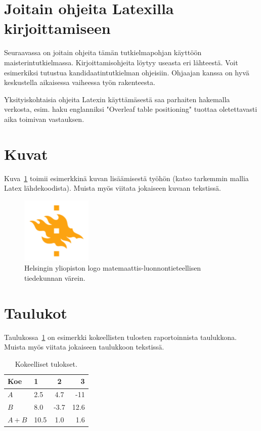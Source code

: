 \section{Joitain ohjeita Latexilla kirjoittamiseen}

Seuraavassa on joitain ohjeita tämän tutkielmapohjan käyttöön maisterintutkielmassa. Kirjoittamisohjeita löytyy useasta eri lähteestä. Voit esimerkiksi tutustua kandidaatintutkielman ohjeisiin. 
Ohjaajan kanssa on hyvä keskustella aikaisessa vaiheessa työn rakenteesta.

Yksityiskohtaisia ohjeita Latexin käyttämäsestä saa parhaiten hakemalla verkosta, esim. haku englanniksi "Overleaf table positioning" tuottaa oletettavasti aika toimivan vastauksen.

\section{Kuvat}
Kuva~\ref{fig:logo-fi} toimii esimerkkinä kuvan lisäämisestä työhön (katso tarkemmin mallia Latex lähdekoodista). Muista myös viitata jokaiseen kuvaan tekstissä. 

\begin{figure}[ht] %
\centering 
\includegraphics[width=0.3\textwidth]{template/figures/HY-logo-ml.png}
\caption{Helsingin yliopiston logo matemaattis-luonnontieteellisen tiedekunnan värein.\label{fig:logo-fi}}
\end{figure}

\newpage %
\section{Taulukot}

Taulukossa~\ref{table:results-fi} on esimerkki kokeellisten tulosten raportoinnista taulukkona. Muista myös viitata jokaiseen taulukkoon tekstissä.
\begin{table}[ht]
\centering
\caption{Kokeelliset tulokset.\label{table:results-fi}}
\begin{tabular}{l||l c r} 
Koe & 1 & 2 & 3 \\ 
\hline \hline 
$A$ & 2.5 & 4.7 & -11 \\
$B$ & 8.0 & -3.7 & 12.6 \\
$A+B$ & 10.5 & 1.0 & 1.6 \\
\hline
%
\end{tabular}
\end{table}

